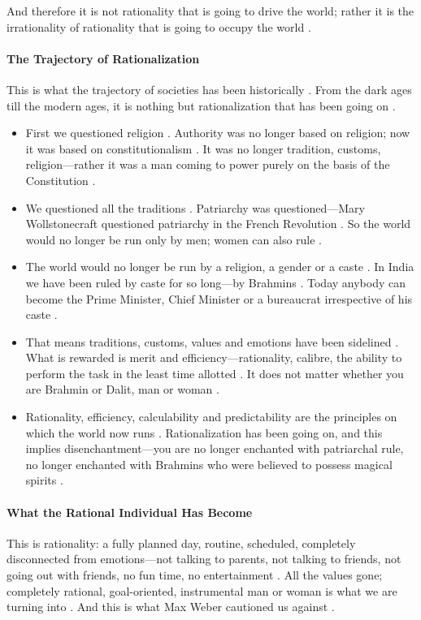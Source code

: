 \begin{CriticalPoint}
And therefore it is not rationality that is going to drive the world; rather it is the irrationality of rationality that is going to occupy the world .
\end{CriticalPoint}

\paragraph{The Trajectory of Rationalization}
This is what the trajectory of societies has been historically . From the dark ages till the modern ages, it is nothing but rationalization that has been going on .
\begin{itemize}
    \item First we questioned religion . Authority was no longer based on religion; now it was based on constitutionalism . It was no longer tradition, customs, religion---rather it was a man coming to power purely on the basis of the Constitution .
    \item We questioned all the traditions . Patriarchy was questioned---Mary Wollstonecraft questioned patriarchy in the French Revolution . So the world would no longer be run only by men; women can also rule .
    \item The world would no longer be run by a religion, a gender or a caste . In India we have been ruled by caste for so long---by Brahmins . Today anybody can become the Prime Minister, Chief Minister or a bureaucrat irrespective of his caste .
    \item That means traditions, customs, values and emotions have been sidelined . What is rewarded is merit and efficiency---rationality, calibre, the ability to perform the task in the least time allotted . It does not matter whether you are Brahmin or Dalit, man or woman .
    \item Rationality, efficiency, calculability and predictability are the principles on which the world now runs . Rationalization has been going on, and this implies disenchantment---you are no longer enchanted with patriarchal rule, no longer enchanted with Brahmins who were believed to possess magical spirits .
\end{itemize}

\paragraph{What the Rational Individual Has Become}
This is rationality: a fully planned day, routine, scheduled, completely disconnected from emotions---not talking to parents, not talking to friends, not going out with friends, no fun time, no entertainment . All the values gone; completely rational, goal-oriented, instrumental man or woman is what we are turning into . And this is what Max Weber cautioned us against .

